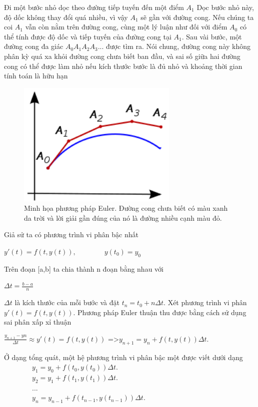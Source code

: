 \documentclass[a4paper]{article}
\begin{document}
Đi một bước nhỏ dọc theo đường tiếp tuyến đến một điểm $A_{1}$ Dọc bước nhỏ này, độ dốc không thay đổi quá nhiều, vì vậy $ A_{1}$ sẽ gần với đường cong. Nếu chúng ta coi $A_{1}$ vẫn còn nằm trên đường cong, cùng một lý luận như đối với điểm $A_{0}$ có thể tính được độ dốc và tiếp tuyến của đường cong tại $A_{1}$. Sau vài bước, một đường cong đa giác $ A_{0}A_{1}A_{2}A_{3}$... được tìm ra. Nói chung, đường cong này không phân kỳ quá xa khỏi đường cong chưa biết ban đầu, và sai số giữa hai đường cong có thể được làm nhỏ nếu kích thước bước là đủ nhỏ và khoảng thời gian tính toán là hữu hạn\\
  \begin{figure}[htp]
	\includegraphics[height=6cm]{Images/Euler_method.png}
	\centering
	\caption{Minh họa phương pháp Euler. Đường cong chưa biết có màu xanh da trời và lời giải gần đúng của nó là đường nhiều cạnh màu đỏ.}
	\centering
	\end{figure}
	\FloatBarrier

Giả sử ta có phương trình vi phân bậc nhất
\begin{center}
    $ y'(t)=f(t,y(t)),\qquad \qquad y(t_{0})=y_{0}$
\end{center}

Trên đoạn [a,b] ta chia thành n đoạn bằng nhau với\\
\begin{center}
    $\Delta t = \frac{b-a}{n}$ 
\end{center}
$\Delta t$ là kích thước của mỗi bước và đặt $t_{n}=t_{0}+n\Delta t$. Xét phương trình vi phân $y'(t)=f(t,y(t))$. Phương pháp Euler thuận thu được bằng cách sử dụng sai phân xấp xỉ thuận
\begin{center}
    $\frac{y_{n+1}-y{n}}{\Delta t}\approx y'(t)=f(t,y(t))$
    =>$y_{n+1}=y_{n}+f(t,y(t))\Delta t.$
\end{center}

Ở dạng tổng quát, một hệ phương trình vi phân bậc một được viết dưới dạng\\
    $\qquad \qquad y_{1}=y_{0}+f(t_{0},y(t_{0}))\Delta t.$\\
    $\qquad \qquad y_{2}=y_{1}+f(t_{1},y(t_{1}))\Delta t.$\\
    $\qquad \qquad ...$\\
    $\qquad \qquad y_{n}=y_{n-1}+f(t_{n-1},y(t_{n-1}))\Delta t.$\\
\end{document}
